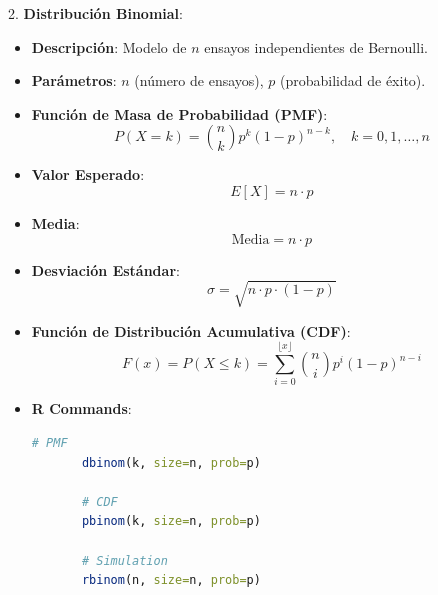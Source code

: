 \documentclass{article}
\begin{document}
2. \textbf{{\Large Distribución Binomial}}:
   \begin{itemize}
       \item \textbf{Descripción}: Modelo de \( n \) ensayos independientes de Bernoulli.
       \item \textbf{Parámetros}: \( n \) (número de ensayos), \( p \) (probabilidad de éxito).
       \item \textbf{Función de Masa de Probabilidad (PMF)}:
       \[
       P(X=k) = \binom{n}{k} p^k (1-p)^{n-k}, \quad k = 0, 1, \ldots, n
       \]
       \item \textbf{Valor Esperado}:
       \[
       E[X] = n \cdot p
       \]
       \item \textbf{Media}:
       \[
       \text{Media} = n \cdot p
       \]
       \item \textbf{Desviación Estándar}:
       \[
       \sigma = \sqrt{n \cdot p \cdot (1-p)}
       \]
       \item \textbf{Función de Distribución Acumulativa (CDF)}:
       \[
       F(x) = P(X \leq k) = \sum_{i=0}^{\lfloor x \rfloor} \binom{n}{i} p^i (1-p)^{n-i}
       \]
       \item \textbf{R Commands}:
        \begin{lstlisting}[style=colored, language=R]
       # PMF
       dbinom(k, size=n, prob=p)
       
       # CDF
       pbinom(k, size=n, prob=p)
       
       # Simulation
       rbinom(n, size=n, prob=p)
       \end{lstlisting}
   \end{itemize}
\end{document}
